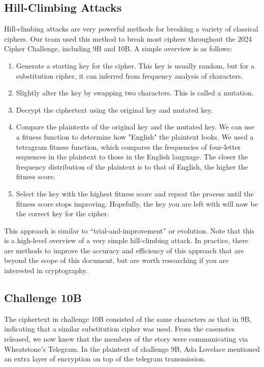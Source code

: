 \subsection*{Hill-Climbing Attacks}

Hill-climbing attacks are very powerful methods for breaking a variety of classical ciphers. Our team used this method to break most ciphers throughout the 2024 Cipher Challenge, including 9B and 10B. A simple overview is as follows:

\begin{enumerate}
    \item Generate a starting key for the cipher. This key is usually random, but for a substitution cipher, it can inferred from frequency analysis of characters.
    \item Slightly alter the key by swapping two characters. This is called a mutation.
    \item Decrypt the ciphertext using the original key and mutated key.
    \item Compare the plaintexts of the original key and the mutated key. We can use a fitness function to determine how "English" the plaintext looks. We used a tetragram fitness function, which compares the frequencies of four-letter sequences in the plaintext to those in the English language. The closer the frequency distribution of the plaintext is to that of English, the higher the fitness score.
    \item Select the key with the highest fitness score and repeat the process until the fitness score stops improving. Hopefully, the key you are left with will now be the correct key for the cipher.
\end{enumerate}

This approach is similar to \enquote{trial-and-improvement} or evolution. Note that this is a high-level overview of a very simple hill-climbing attack. In practice, there are methods to improve the accuracy and efficiency of this approach that are beyond the scope of this document, but are worth researching if you are interested in cryptography.

\subsection*{Challenge 10B}
The ciphertext in challenge 10B consisted of the same characters as that in 9B, indicating that a similar substitution cipher was used. From the casenotes released, we now knew that the members of the story were communicating via Wheatstone's Telegram. In the plaintext of challenge 9B, Ada Lovelace mentioned an extra layer of encryption on top of the telegram transmission.

